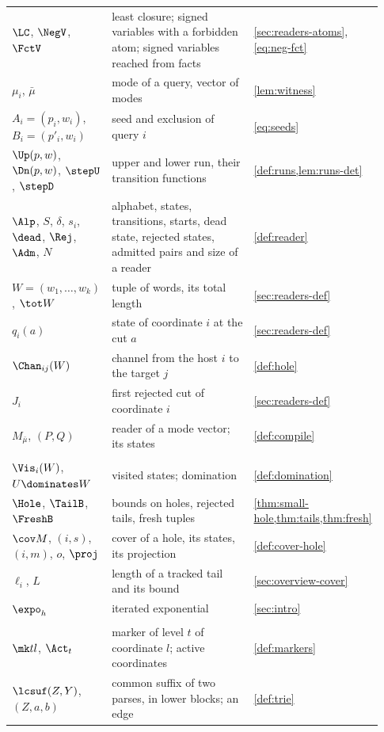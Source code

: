 {\begin{longtable}{@{}>{\raggedright\arraybackslash}p{0.24\linewidth}>{\raggedright\arraybackslash}p{0.49\linewidth}>{\raggedright\arraybackslash}p{0.20\linewidth}@{}}
$\LC$, $\NegV$, $\FctV$ & least closure; signed variables with a forbidden atom; signed variables reached from facts & \cref{sec:readers-atoms}, \eqref{eq:neg-fct} \\
$\mu_i$, $\bar\mu$ & mode of a query, vector of modes & \cref{lem:witness} \\
$A_i=(p_i,w_i)$, $B_i=(p'_i,w_i)$ & seed and exclusion of query $i$ & \eqref{eq:seeds} \\
$\Up(p,w)$, $\Dn(p,w)$, $\stepU$, $\stepD$ & upper and lower run, their transition functions & \cref{def:runs,lem:runs-det} \\
$\Alp$, $S$, $\delta$, $s_i$, $\dead$, $\Rej$, $\Adm$, $N$ & alphabet, states, transitions, starts, dead state, rejected states, admitted pairs and size of a reader & \cref{def:reader} \\
$W=(w_1,\dots,w_k)$, $\tot W$ & tuple of words, its total length & \cref{sec:readers-def} \\
$q_i(a)$ & state of coordinate $i$ at the cut $a$ & \cref{sec:readers-def} \\
$\Chan_{ij}(W)$ & channel from the host $i$ to the target $j$ & \cref{def:hole} \\
$J_i$ & first rejected cut of coordinate $i$ & \cref{sec:readers-def} \\
$M_{\bar\mu}$, $(P,Q)$ & reader of a mode vector; its states & \cref{def:compile} \\
\addlinespace
\multicolumn{3}{@{}l}{\emph{Small holes}}\\
$\Vis_i(W)$, $U\dominates W$ & visited states; domination & \cref{def:domination} \\
$\Hole$, $\TailB$, $\FreshB$ & bounds on holes, rejected tails, fresh tuples & \cref{thm:small-hole,thm:tails,thm:fresh} \\
$\cov M$, $(i,s)$, $(i,m)$, $o$, $\proj$ & cover of a hole, its states, its projection & \cref{def:cover-hole} \\
$\ell_i$, $L$ & length of a tracked tail and its bound & \cref{sec:overview-cover} \\
$\expo_h$ & iterated exponential & \cref{sec:intro} \\
\addlinespace
\multicolumn{3}{@{}l}{\emph{Fresh tuples}}\\
$\mk tl$, $\Act_t$ & marker of level $t$ of coordinate $l$; active coordinates & \cref{def:markers} \\
$\lcsuf(Z,Y)$, $(Z,a,b)$ & common suffix of two parses, in lower blocks; an edge & \cref{def:trie} \\

\end{longtable}}
